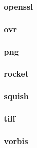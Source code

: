\documentclass[a4paper]{article}
\begin{document}
\clearpage\subsubsection[openssl]{openssl}
\hypertarget{RefHeading24491167907073}{}\subsubsection{}
\clearpage\subsubsection[ovr]{ovr}
\hypertarget{RefHeading24511167907073}{}\subsubsection{}
\clearpage\subsubsection[png]{png}
\hypertarget{RefHeading24531167907073}{}\subsubsection{}
\clearpage\subsubsection[rocket]{rocket}
\hypertarget{RefHeading24551167907073}{}\subsubsection{}
\clearpage\subsubsection[squish]{squish}
\hypertarget{RefHeading24571167907073}{}\subsubsection{}
\clearpage\subsubsection[tiff]{tiff}
\hypertarget{RefHeading24591167907073}{}\subsubsection{}
\clearpage\subsubsection[vorbis]{vorbis}
\end{document}

